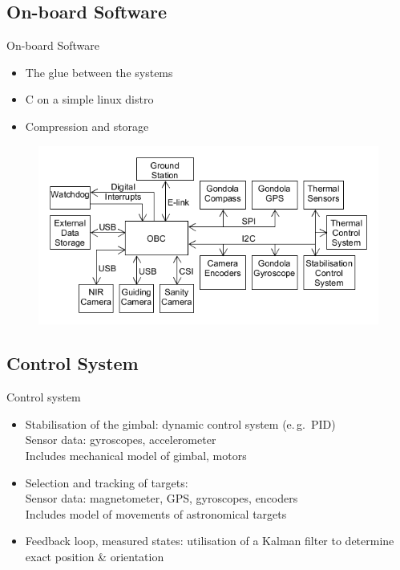 \documentclass[11pt, aspectratio=169]{beamer}
\begin{document}
\subsection{On-board Software} 	%
\begin{frame}{On-board Software}
\begin{itemize}
	\item The glue between the systems
	\item C on a simple linux distro
	\item Compression and storage
\end{itemize}
\begin{figure}
	\includegraphics[scale=0.4]{figures/images/process-overview.png}
\end{figure}
\end{frame}

\subsection{Control System} 	%
\begin{frame}[t]{Control system}
\begin{itemize}
	\item<1-> Stabilisation of the gimbal: dynamic control system (e.\,g.~PID) \\
		Sensor data: gyroscopes, accelerometer\\
		Includes mechanical model of gimbal, motors
	\item<2-> Selection and tracking of targets: \\
		Sensor data: magnetometer, GPS, gyroscopes, encoders \\
		Includes model of movements of astronomical targets
	\item<3-> Feedback loop, measured states: utilisation of a Kalman filter to determine exact position \& orientation
\end{itemize}

\end{frame}
\end{document}
